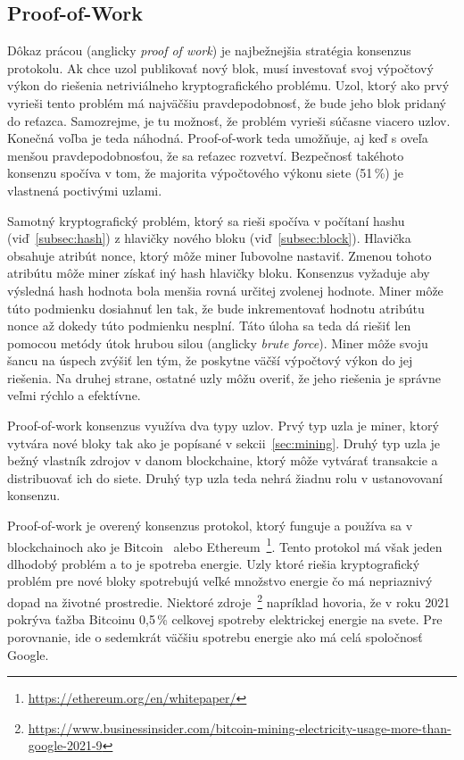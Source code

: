 \subsection{Proof-of-Work}\label{subsec:pow}
Dôkaz prácou (anglicky \textit{proof of work}) je najbežnejšia stratégia konsenzus protokolu. Ak chce uzol publikovať nový blok, musí investovať svoj výpočtový výkon do riešenia netriviálneho kryptografického problému. Uzol, ktorý ako prvý vyrieši tento problém má najväčšiu pravdepodobnosť, že bude jeho blok pridaný do reťazca. Samozrejme, je tu možnosť, že problém vyrieši súčasne viacero uzlov. Konečná voľba je teda náhodná. Proof-of-work teda umožňuje, aj keď s oveľa menšou pravdepodobnosťou, že sa reťazec rozvetví. Bezpečnosť takéhoto konsenzu spočíva v tom, že majorita výpočtového výkonu siete (51\,\%) je vlastnená poctivými uzlami.~\cite{leporeConsensus}

Samotný kryptografický problém, ktorý sa rieši spočíva v počítaní hashu (viď~\ref{subsec:hash}) z hlavičky nového bloku (viď~\ref{subsec:block}). Hlavička obsahuje atribút nonce, ktorý môže miner ľubovolne nastaviť. Zmenou tohoto atribútu môže miner získať iný hash hlavičky bloku. Konsenzus vyžaduje aby výsledná hash hodnota bola menšia rovná určitej zvolenej hodnote. Miner môže túto podmienku dosiahnuť len tak, že bude inkrementovať hodnotu atribútu nonce až dokedy túto podmienku nesplní. Táto úloha sa teda dá riešiť len pomocou metódy útok hrubou silou (anglicky \textit{brute force}). Miner môže svoju šancu na úspech zvýšiť len tým, že poskytne väčší výpočtový výkon do jej riešenia. Na druhej strane, ostatné uzly môžu overiť, že jeho riešenia je správne veľmi rýchlo a efektívne.~\cite{zhengBlockchainOverview}

Proof-of-work konsenzus využíva dva typy uzlov. Prvý typ uzla je miner, ktorý vytvára nové bloky tak ako je popísané v sekcii~\ref{sec:mining}. Druhý typ uzla je bežný vlastník zdrojov v danom blockchaine, ktorý môže vytvárať transakcie a distribuovať ich do siete. Druhý typ uzla teda nehrá žiadnu rolu v ustanovovaní konsenzu.~\cite{leporeConsensus}

Proof-of-work je overený konsenzus protokol, ktorý funguje a používa sa v blockchainoch ako je Bitcoin~\cite{satoshiBitcoin} alebo Ethereum~\footnote{\url{https://ethereum.org/en/whitepaper/}}. Tento protokol má však jeden dlhodobý problém a to je spotreba energie. Uzly ktoré riešia kryptografický problém pre nové bloky spotrebujú veľké množstvo energie čo má nepriaznivý dopad na životné prostredie. Niektoré zdroje~\footnote{\url{https://www.businessinsider.com/bitcoin-mining-electricity-usage-more-than-google-2021-9}} napríklad hovoria, že v roku 2021 pokrýva ťažba Bitcoinu 0,5\,\% celkovej spotreby elektrickej energie na svete. Pre porovnanie, ide o sedemkrát väčšiu spotrebu energie ako má celá spoločnosť Google.~\cite{leporeConsensus}

